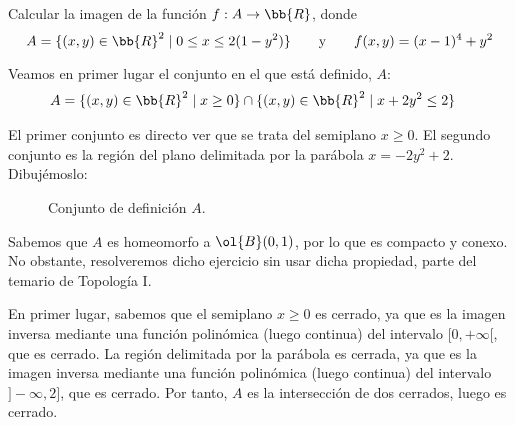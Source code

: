 \begin{ejercicio}
    Calcular la imagen de la función $f:A\to \bb{R}$, donde
    \begin{equation*}
        A = \{(x,y)\in \bb{R}^2\mid 0\leq x \leq 2(1-y^2)\}
        \qquad \text{y} \qquad
        f(x,y)=(x-1)^4 + y^2
    \end{equation*}

    Veamos en primer lugar el conjunto en el que está definido, $A$:
    \begin{align*}
        A &= \{(x,y)\in \bb{R}^2\mid x\geq 0\} \cap \{(x,y)\in \bb{R}^2\mid x+2y^2\leq 2\}
    \end{align*}

    El primer conjunto es directo ver que se trata del semiplano $x\geq 0$. El segundo conjunto es
    la región del plano delimitada por la parábola $x=-2y^2+2$. Dibujémoslo:
    \begin{figure}[H]
        \centering
        \caption{Conjunto de definición $A$.}
    \end{figure}

    Sabemos que $A$ es homeomorfo a $\ol{B}(0,1)$, por lo que es compacto y conexo.
    No obstante, resolveremos dicho ejercicio sin usar dicha propiedad, parte del temario de Topología I.

    En primer lugar, sabemos que el semiplano $x\geq 0$ es cerrado, ya que es la imagen inversa mediante una función polinómica (luego continua) del intervalo $[0,+\infty[$, que es cerrado.
    La región delimitada por la parábola es cerrada, ya que es la imagen inversa mediante una función polinómica (luego continua) del intervalo $]-\infty,2]$, que es cerrado.
    Por tanto, $A$ es la intersección de dos cerrados, luego es cerrado.
    

\end{ejercicio}
